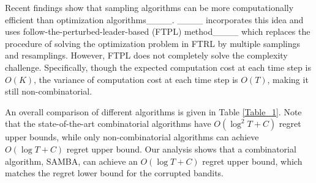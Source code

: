Recent findings show that sampling algorithms can be more computationally efficient than optimization algorithms____. 
____ incorporates this idea and uses follow-the-perturbed-leader-based (FTPL) method____ which replaces the procedure of solving the optimization problem in FTRL by multiple samplings and resamplings. 
However, FTPL does not completely solve the complexity challenge. Specifically, though the expected computation cost at each time step is $O(K)$, the variance of computation cost at each time step is $O(T)$, making it still non-combinatorial.


An overall comparison of different algorithms is given in Table \ref{Table_1}. Note that the state-of-the-art combinatorial algorithms have $O(\log^2 T+C)$ regret upper bounds, 
while only non-combinatorial algorithms can achieve $O(\log T + C)$ regret upper bound. 
Our analysis shows that a combinatorial algorithm, SAMBA, can achieve an $O(\log T + C)$ regret upper bound, which matches the regret lower bound for the corrupted bandits.